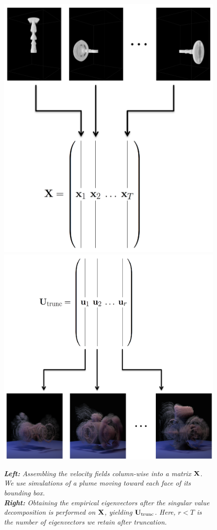 \documentclass[11pt]{article}
\begin{document}

\begin{figure}
		\centering
		\includegraphics[height=0.45\textwidth]{Figures/plume_training.png}
		\includegraphics[height=0.45\textwidth]{Figures/U_trunc_alt.png}
		\caption{{\em{\bf Left:} Assembling the velocity fields column-wise into a matrix $\mathbf{X}$. We use simulations of a plume moving toward each face of its bounding box.}\\{\em{\bf Right:} Obtaining the empirical eigenvectors after the singular value decomposition is performed on $\mathbf{X}$, yielding $\mathbf{U}_{\textnormal{trunc}}$. Here, $r<T$ is the number of eigenvectors we retain after truncation.}}
		\label{fig:matrices}
\end{figure}
	
\end{document}
